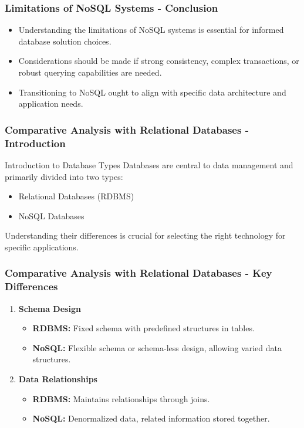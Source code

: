 \documentclass[aspectratio=169]{beamer}
\begin{document}
\begin{frame}[fragile]
    \frametitle{Limitations of NoSQL Systems - Conclusion}
    \begin{itemize}
        \item Understanding the limitations of NoSQL systems is essential for informed database solution choices.
        \item Considerations should be made if strong consistency, complex transactions, or robust querying capabilities are needed.
        \item Transitioning to NoSQL ought to align with specific data architecture and application needs.
    \end{itemize}
\end{frame}

\begin{frame}[fragile]
    \frametitle{Comparative Analysis with Relational Databases - Introduction}
    \begin{block}{Introduction to Database Types}
        Databases are central to data management and primarily divided into two types:
        \begin{itemize}
            \item Relational Databases (RDBMS)
            \item NoSQL Databases
        \end{itemize}
        Understanding their differences is crucial for selecting the right technology for specific applications.
    \end{block}
\end{frame}

\begin{frame}[fragile]
    \frametitle{Comparative Analysis with Relational Databases - Key Differences}
    \begin{enumerate}
        \item \textbf{Schema Design}
            \begin{itemize}
                \item \textbf{RDBMS:} Fixed schema with predefined structures in tables.
                \item \textbf{NoSQL:} Flexible schema or schema-less design, allowing varied data structures.
            \end{itemize}
        \item \textbf{Data Relationships}
            \begin{itemize}
                \item \textbf{RDBMS:} Maintains relationships through joins.
                \item \textbf{NoSQL:} Denormalized data, related information stored together.
            \end{itemize}
    \end{enumerate}
\end{frame}
\end{document}
